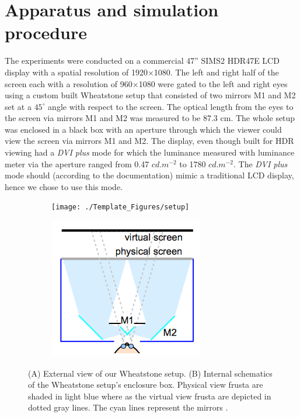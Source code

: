 \section{Apparatus and simulation procedure}
The experiments were conducted on a commercial 47'' SIMS2 HDR47E LCD display with a spatial resolution of 1920$\times$1080. The left and right half of the screen each with a resolution of 960$\times$1080 were gated to the left and right eyes using a custom built Wheatstone setup \cite{ wiki:wheatstone} that consisted of two mirrors M1 and M2 set at a $45^\circ$ angle with respect to the screen. The optical length from the eyes to the screen via mirrors M1 and M2 was measured to be 87.3 cm. The whole setup was enclosed in a black box with an aperture through which the viewer could view the screen via mirrors M1 and M2. The display, even though built for HDR viewing had a \emph{DVI plus} mode for which the luminance measured with luminance meter via the aperture ranged from 0.47 $cd.m^{-2}$ to 1780 $cd.m^{-2}$. The \emph{DVI plus} mode should (according to the documentation) mimic a traditional LCD display, hence we chose to use this mode.
\begin{figure}[htbp]
    \begin{subfigure}[b]{0.5\textwidth}
        \texttt{[image: ./Template\_Figures/setup]}
        \caption{}\label{fig:setup}
    \end{subfigure}
    \begin{subfigure}[b]{0.4\textwidth}
        \includegraphics[width=\textwidth]{./Template_Figures/setup_sch}
        \caption{}\label{fig:setup_sch}
    \end{subfigure}
    \caption{(A) External view of our Wheatstone setup. (B) Internal schematics of the Wheatstone setup's enclosure box. Physical view frusta are shaded in light blue where as the virtual view frusta are depicted in dotted gray lines. The cyan lines represent the mirrors \cite{vangorp2014depth}.\label{fig:wheatstone_setup}}
\end{figure}

